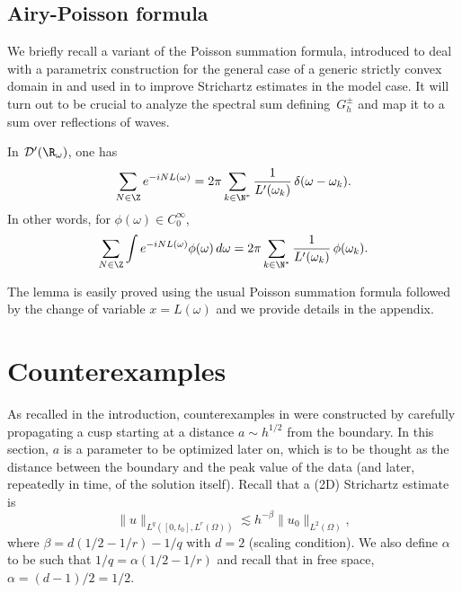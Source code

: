 \subsection{Airy-Poisson formula}
We briefly recall a variant of the Poisson summation formula, introduced to deal with a parametrix construction for the general case of a generic strictly convex domain in \cite{ILLP} and used in \cite{ILP3} to improve Strichartz estimates in the model case. It will turn out to be crucial to analyze the spectral sum defining~$G^{\pm}_{h}$ and map it to a sum over reflections of waves.
\begin{lemma}
\label{AiryPoisson}
In $\mathcal{D}'(\R_\omega)$, one has
\begin{equation*}
\label{eq:AiryPoisson}
\sum_{N\in \Z} e^{-i NL(\omega)}= 2\pi \sum_{k\in \N^*} \frac 1
{L'(\omega_k)}\, \delta(\omega-\omega_k).
\end{equation*}
In other words, for $\phi(\omega)\in C_{0}^{\infty}$,
\begin{equation}
\label{eq:AiryPoissonBis}
\sum_{N\in \Z} \int e^{-i NL(\omega)} \phi(\omega)\,d\omega = 2\pi \sum_{k\in \N^*} \frac 1
{L'(\omega_k)}\, \phi(\omega_k).
\end{equation}

\end{lemma}
The lemma is easily proved using the usual Poisson summation formula
followed by the change of variable $x=L(\omega)$ and we provide details in the appendix.

\section{Counterexamples}
As recalled in the introduction, counterexamples in \cite{doi} were constructed by carefully
propagating a cusp starting at a distance $a\sim h^{1/2}$ from the boundary. In this section, $a$ is a parameter to be optimized later on, which is to be thought as the distance between the boundary and the peak value of the data (and later, repeatedly in time, of the solution itself). Recall that a (2D) Strichartz estimate is
\begin{equation}
\label{eq:31}
\| u\|_{L^{q}([0,t_{0}],L^{r}(\Omega))}\lesssim h^{-\beta} \|u_{0}\|_{L^{2}(\Omega)},
\end{equation}
where $\beta=d(1/2-1/r)-1/q$ with $d=2$ (scaling condition). We also define $\alpha$ to be such that $1/q=\alpha(1/2-1/r)$ and recall that in free space, $\alpha=(d-1)/2=1/2$.
